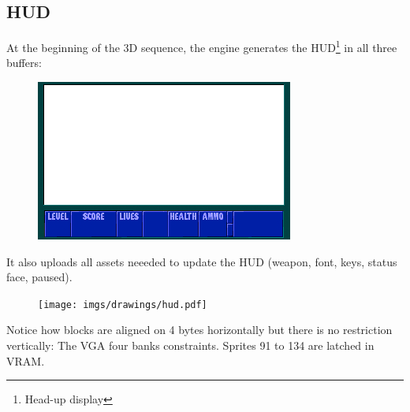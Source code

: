 \subsection{HUD}
At the beginning of the 3D sequence, the engine generates the HUD\footnote{Head-up display} in all three buffers:\\
\begin{figure}[H]
  \centering
 \includegraphics[width=\textwidth]{screenshots/hud_empty.png}
\end{figure}
It also uploads all assets neeeded to update the HUD (weapon, font, keys, status face, paused).
\begin{figure}[H]
  \centering
 \texttt{[image: imgs/drawings/hud.pdf]}
\end{figure}
Notice how blocks are aligned on 4 bytes horizontally but there is no restriction vertically: The VGA four banks constraints.
Sprites 91 to 134 are latched in VRAM.\\

\begin{minipage}{.23\textwidth}
  \end{minipage}
\begin{minipage}{.23\textwidth}
  \end{minipage}
\begin{minipage}{.23\textwidth}
  \end{minipage}
\begin{minipage}{.23\textwidth}
  \end{minipage}
\par


